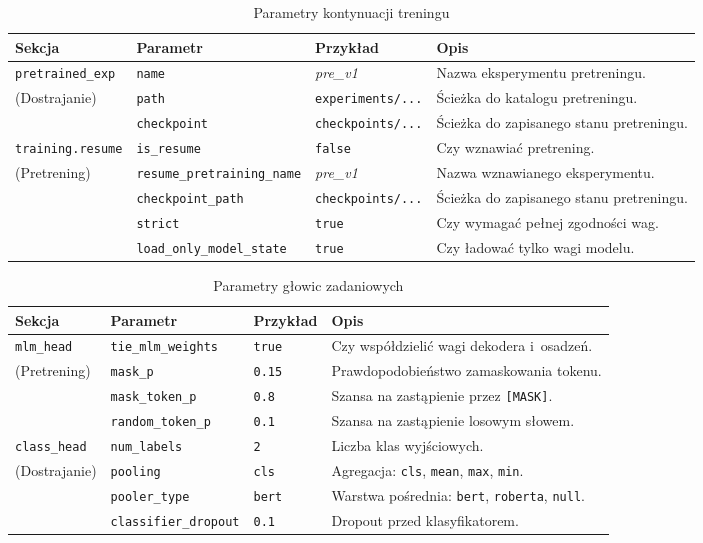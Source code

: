 \documentclass[a4paper,11pt,twoside]{report}
\theoremstyle{definition}
\begin{document}
\begin{table}[h!]
\centering
\caption{Parametry kontynuacji treningu}
\label{tab:params_continuation}
\small
\smallskip
\begin{tabularx}{\textwidth}{@{}lllX@{}}
\toprule
\textbf{Sekcja} & \textbf{Parametr} & \textbf{Przykład} & \textbf{Opis} \\
\midrule
\texttt{pretrained\_exp} 
    & \texttt{name} & \textit{pre\_v1} & Nazwa eksperymentu pretreningu. \\
(Dostrajanie)    & \texttt{path} & \texttt{experiments/...} & Ścieżka do katalogu pretreningu. \\
    & \texttt{checkpoint} & \texttt{checkpoints/...} & Ścieżka do zapisanego stanu pretreningu. \\
\midrule
\texttt{training.resume} 
    & \texttt{is\_resume} & \texttt{false} & Czy wznawiać pretrening. \\
(Pretrening)    & \texttt{resume\_pretraining\_name} & \textit{pre\_v1} & Nazwa wznawianego eksperymentu. \\
    & \texttt{checkpoint\_path} & \texttt{checkpoints/...} & Ścieżka do zapisanego stanu pretreningu. \\
    & \texttt{strict} & \texttt{true} & Czy wymagać pełnej zgodności wag. \\
    & \texttt{load\_only\_model\_state} & \texttt{true} & Czy ładować tylko wagi modelu. \\
\bottomrule
\end{tabularx}
\end{table}

\begin{table}[h!]
\centering
\caption{Parametry głowic zadaniowych}
\label{tab:params_heads}
\small
\smallskip
\begin{tabularx}{\textwidth}{@{}lllX@{}}
\toprule
\textbf{Sekcja} & \textbf{Parametr} & \textbf{Przykład} & \textbf{Opis} \\
\midrule
\texttt{mlm\_head} 
    & \texttt{tie\_mlm\_weights} & \texttt{true} & Czy współdzielić wagi dekodera i~osadzeń. \\
(Pretrening)    & \texttt{mask\_p} & \texttt{0.15} & Prawdopodobieństwo zamaskowania tokenu. \\
    & \texttt{mask\_token\_p} & \texttt{0.8} & Szansa na zastąpienie przez \texttt{[MASK]}. \\
    & \texttt{random\_token\_p} & \texttt{0.1} & Szansa na zastąpienie losowym słowem. \\
\midrule
\texttt{class\_head} 
    & \texttt{num\_labels} & \texttt{2} & Liczba klas wyjściowych. \\
(Dostrajanie)    & \texttt{pooling} & \texttt{cls} & Agregacja: \texttt{cls}, \texttt{mean}, \texttt{max}, \texttt{min}. \\
    & \texttt{pooler\_type} & \texttt{bert} & Warstwa pośrednia: \texttt{bert}, \texttt{roberta}, \texttt{null}. \\
    & \texttt{classifier\_dropout} & \texttt{0.1} & Dropout przed klasyfikatorem. \\
\bottomrule
\end{tabularx}
\end{table}
\end{document}

